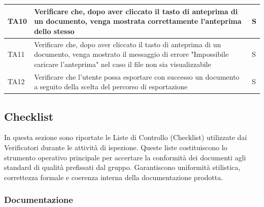 \documentclass[a4paper,12pt]{article}
\begin{document}
\begin{longtable}{|M{1.5cm}|M{8.5cm}|M{2cm}|}
                TA10 & Verificare che, dopo aver cliccato il tasto di anteprima di un documento, venga mostrata correttamente l'anteprima dello stesso & S \\
                \hline

                TA11 & Verificare che, dopo aver cliccato il tasto di anteprima di un documento, venga mostrato il messaggio di errore "Impossibile caricare l'anteprima" nel caso il file non sia visualizzabile & S \\
                \hline
                
                TA12 & Verificare che l’utente possa esportare con successo un documento a seguito della scelta del percorso di esportazione & S \\
                \hline

            \end{longtable}


        \subsection{Checklist}

        In questa sezione sono riportate le Liste di Controllo (Checklist) utilizzate dai Verificatori durante le attività di ispezione. Queste liste costituiscono lo strumento operativo principale per accertare la conformità dei documenti agli standard di qualità prefissati dal gruppo. 
        Garantiscono uniformità stilistica, correttezza formale e coerenza interna della documentazione prodotta.

            \subsubsection{Documentazione}
\end{document}
